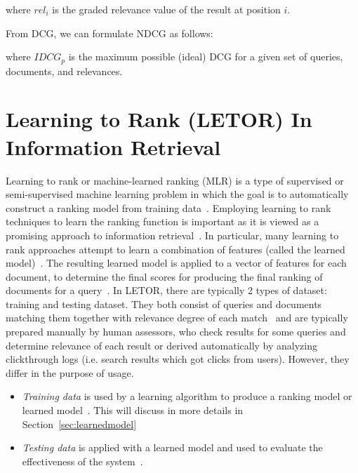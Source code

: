 \begin{center}
\end{center}

where $rel_{i}$ is the graded relevance value of the result at position $i$.

From DCG, we can formulate NDCG as follows:
\begin{center}
\end{center}
where $IDCG_p$ is the maximum possible (ideal) DCG for a given set of queries, documents, and relevances.


\section{Learning to Rank (LETOR) In Information Retrieval}\label{sec:letor}
Learning to rank or machine-learned ranking (MLR) is a type of supervised or semi-supervised machine learning problem in which the goal is 
to automatically construct a ranking model from training data~\cite{letor}.
Employing learning to rank techniques to learn the ranking function is important as it is viewed as
a promising approach to information retrieval~\cite{letor}. In particular, many learning to rank approaches attempt to learn a combination of features
(called the learned model)~\cite[P. 3]{learningmodel}. The resulting learned model is applied to a vector of features for each document, to determine the final scores for 
producing the final ranking of documents for a query~\cite[P. 3]{learningmodel}. In LETOR, there are typically 2 types of dataset: training and testing dataset.
They both consist of queries and documents matching them together with relevance degree of each match~\cite{letorWiki} and are typically
prepared manually by human assessors, who check results for some queries and determine relevance of each result or 
derived automatically by analyzing clickthrough logs (i.e. search results which got clicks from users). However, they differ in the purpose of usage.
\begin{itemize}
 \item \textit{Training data} is used by a learning algorithm to produce a ranking model or learned model~\cite{letorWiki}. 
 This will discuss in more details in Section~\ref{sec:learnedmodel}
 \item \textit{Testing data} is applied with a learned model and used to evaluate the effectiveness of the system~\cite{craig}.
\end{itemize}

